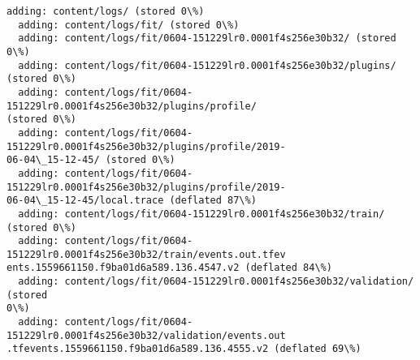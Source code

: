 \documentclass[11pt]{article}
\begin{document}
    \begin{Verbatim}[commandchars=\\\{\}]
  adding: content/logs/ (stored 0\%)
  adding: content/logs/fit/ (stored 0\%)
  adding: content/logs/fit/0604-151229lr0.0001f4s256e30b32/ (stored 0\%)
  adding: content/logs/fit/0604-151229lr0.0001f4s256e30b32/plugins/ (stored 0\%)
  adding: content/logs/fit/0604-151229lr0.0001f4s256e30b32/plugins/profile/
(stored 0\%)
  adding: content/logs/fit/0604-151229lr0.0001f4s256e30b32/plugins/profile/2019-
06-04\_15-12-45/ (stored 0\%)
  adding: content/logs/fit/0604-151229lr0.0001f4s256e30b32/plugins/profile/2019-
06-04\_15-12-45/local.trace (deflated 87\%)
  adding: content/logs/fit/0604-151229lr0.0001f4s256e30b32/train/ (stored 0\%)
  adding: content/logs/fit/0604-151229lr0.0001f4s256e30b32/train/events.out.tfev
ents.1559661150.f9ba01d6a589.136.4547.v2 (deflated 84\%)
  adding: content/logs/fit/0604-151229lr0.0001f4s256e30b32/validation/ (stored
0\%)
  adding: content/logs/fit/0604-151229lr0.0001f4s256e30b32/validation/events.out
.tfevents.1559661150.f9ba01d6a589.136.4555.v2 (deflated 69\%)
\end{Verbatim}


    
    
    
    
\end{document}
